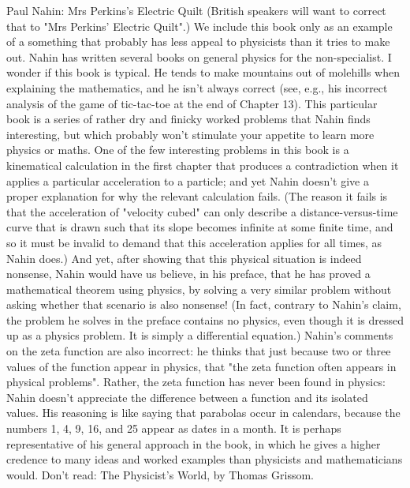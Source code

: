 \documentclass[10pt,a4paper]{book}
\theoremstyle{definition}
\begin{document}
Paul Nahin: Mrs Perkins's Electric Quilt
(British speakers will want to correct that to "Mrs Perkins' Electric Quilt".)  We include this book only as an example of a something that probably has less appeal to physicists than it tries to make out.  Nahin has written several books on general physics for the non-specialist.  I wonder if this book is typical.  He tends to make mountains out of molehills when explaining the mathematics, and he isn't always correct (see, e.g., his incorrect analysis of the game of tic-tac-toe at the end of Chapter 13).  This particular book is a series of rather dry and finicky worked problems that Nahin finds interesting, but which probably won't stimulate your appetite to learn more physics or maths.  One of the few interesting problems in this book is a kinematical calculation in the first chapter that produces a contradiction when it applies a particular acceleration to a particle; and yet Nahin doesn't give a proper explanation for why the relevant calculation fails.  (The reason it fails is that the acceleration of "velocity cubed" can only describe a distance-versus-time curve that is drawn such that its slope becomes infinite at some finite time, and so it must be invalid to demand that this acceleration applies for all times, as Nahin does.)  And yet, after showing that this physical situation is indeed nonsense, Nahin would have us believe, in his preface, that he has proved a mathematical theorem using physics, by solving a very similar problem without asking whether that scenario is also nonsense!  (In fact, contrary to Nahin's claim, the problem he solves in the preface contains no physics, even though it is dressed up as a physics problem.  It is simply a differential equation.)  Nahin's comments on the zeta function are also incorrect: he thinks that just because two or three values of the function appear in physics, that "the zeta function often appears in physical problems".  Rather, the zeta function has never been found in physics: Nahin doesn't appreciate the difference between a function and its isolated values.  His reasoning is like saying that parabolas occur in calendars, because the numbers 1, 4, 9, 16, and 25 appear as dates in a month.  It is perhaps representative of his general approach in the book, in which he gives a higher credence to many ideas and worked examples than physicists and mathematicians would.
Don't read: The Physicist's World, by Thomas Grissom.
\end{document}
